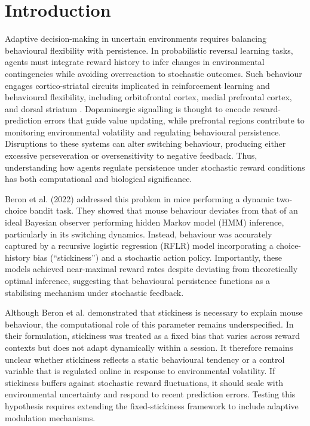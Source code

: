 \documentclass[11pt, reprint, aps, prl]{revtex4-2}
\begin{document}
\section{Introduction}
Adaptive decision-making in uncertain environments requires balancing behavioural flexibility with persistence. In probabilistic reversal learning tasks, agents must integrate reward history to infer changes in environmental contingencies while avoiding overreaction to stochastic outcomes. Such behaviour engages cortico-striatal circuits implicated in reinforcement learning and behavioural flexibility, including orbitofrontal cortex, medial prefrontal cortex, and dorsal striatum \cite{Izquierdo2017}. Dopaminergic signalling is thought to encode reward-prediction errors that guide value updating, while prefrontal regions contribute to monitoring environmental volatility and regulating behavioural persistence. Disruptions to these systems can alter switching behaviour, producing either excessive perseveration or oversensitivity to negative feedback. Thus, understanding how agents regulate persistence under stochastic reward conditions has both computational and biological significance.

Beron et al. (2022) \cite{Beron2022} addressed this problem in mice performing a dynamic two-choice bandit task. They showed that mouse behaviour deviates from that of an ideal Bayesian observer performing hidden Markov model (HMM) inference, particularly in its switching dynamics. Instead, behaviour was accurately captured by a recursive logistic regression (RFLR) model incorporating a choice-history bias (“stickiness”) and a stochastic action policy. Importantly, these models achieved near-maximal reward rates despite deviating from theoretically optimal inference, suggesting that behavioural persistence functions as a stabilising mechanism under stochastic feedback.

Although Beron et al. demonstrated that stickiness is necessary to explain mouse behaviour, the computational role of this parameter remains underspecified. In their formulation, stickiness was treated as a fixed bias that varies across reward contexts but does not adapt dynamically within a session. It therefore remains unclear whether stickiness reflects a static behavioural tendency or a control variable that is regulated online in response to environmental volatility. If stickiness buffers against stochastic reward fluctuations, it should scale with environmental uncertainty and respond to recent prediction errors. Testing this hypothesis requires extending the fixed-stickiness framework to include adaptive modulation mechanisms.
\end{document}
